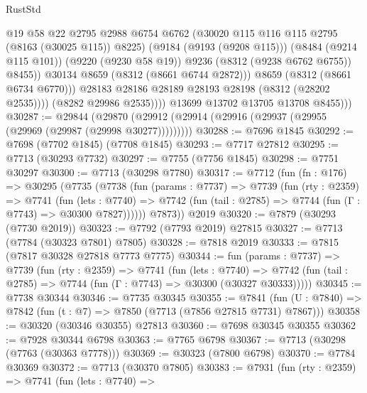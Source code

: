 \begin{lexlean}{RustStd}
\begin{coremodule}
                            @19
                            @58
                            @22
                            @2795
                            @2988
                            @6754
                            @6762
                            (@30020 @115 @116 @115 @2795 (@8163 (@30025 @115)) @8225)
                            (@9184 (@9193 (@9208 @115)))
                            (@8484 (@9214 @115 @101))
                            (@9220 (@9230 @58 @19))
                            @9236
                            (@8312 (@9238 @6762 @6755))
                            @8455))
                        @30134
                        @8659
                        (@8312 (@8661 @6744 @2872)))
                      @8659
                      (@8312 (@8661 @6734 @6770)))
                    @28183
                    @28186
                    @28189
                    @28193
                    @28198
                    (@8312 (@28202 @2535))))
                (@8282 @29986 @2535))))
          @13699
          @13702
          @13705
          @13708
          @8455)))
@30287 := @29844
    (@29870 (@29912 (@29914 (@29916 (@29937 (@29955 (@29969 (@29987 (@29998 @30277)))))))))
@30288 := @7696 @1845
@30292 := @7698 (@7702 @1845) (@7708 @1845)
@30293 := @7717 @27812
@30295 := @7713 (@30293 @7732)
@30297 := @7755 (@7756 @1845)
@30298 := @7751 @30297
@30300 := @7713 (@30298 @7780)
@30317 := @7712
    (fun (fn : @176) =>
    @30295
      (@7735
        (@7738
          (fun (params : @7737) =>
          @7739
            (fun (rty : @2359) =>
            @7741
              (fun (lets : @7740) =>
              @7742 (fun (tail : @2785) => @7744 (fun (Γ : @7743) => @30300 @7827))))))
        @7873))
    @2019
@30320 := @7879 (@30293 (@7730 @2019))
@30323 := @7792 (@7793 @2019) @27815
@30327 := @7713 (@7784 (@30323 @7801) @7805)
@30328 := @7818 @2019
@30333 := @7815 (@7817 @30328 @27818 @7773 @7775)
@30344 := fun (params : @7737) =>
  @7739
    (fun (rty : @2359) =>
    @7741
      (fun (lets : @7740) =>
      @7742 (fun (tail : @2785) => @7744 (fun (Γ : @7743) => @30300 (@30327 @30333)))))
@30345 := @7738 @30344
@30346 := @7735 @30345
@30355 := @7841
    (fun (U : @7840) => @7842 (fun (t : @7) => @7850 (@7713 (@7856 @27815 @7731) @7867)))
@30358 := @30320 (@30346 @30355) @27813
@30360 := @7698 @30345 @30355
@30362 := @7928 @30344 @6798
@30363 := @7765 @6798
@30367 := @7713 (@30298 (@7763 (@30363 @7778)))
@30369 := @30323 (@7800 @6798)
@30370 := @7784 @30369
@30372 := @7713 (@30370 @7805)
@30383 := @7931
    (fun (rty : @2359) =>
    @7741
      (fun (lets : @7740) =>

\end{coremodule}
\end{lexlean}
